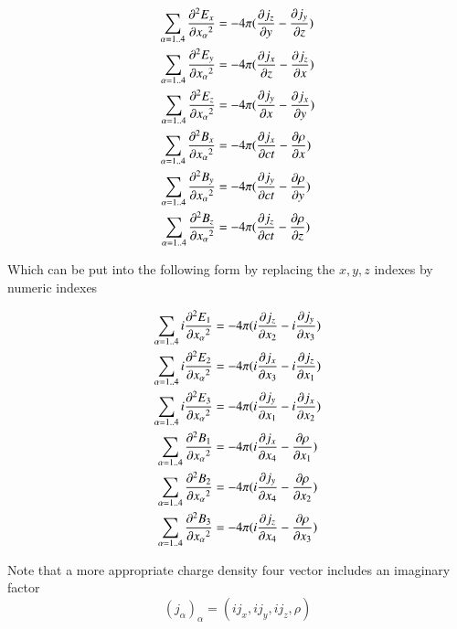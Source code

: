 \documentclass{article}      %
\newcommand{\Curl}[1]{\nabla \times \mathbf{#1}}
\newcommand{\dds}[2]{ {{\partial^2{#1}} \over {\partial{#2}^2}}}
\newcommand{\D}[2] {{{\partial #2} \over {\partial #1}}}
\begin{document}


\begin{align*}
\sum_{\alpha = 1 .. 4}{\dds{E_x} {x_\alpha}} &= - 4\pi (\D {y}{j_z} - \D {z}{j_y}) \\
\sum_{\alpha = 1 .. 4}{\dds{E_y} {x_\alpha}} &= - 4\pi (\D {z}{j_x} - \D {x}{j_z}) \\
\sum_{\alpha = 1 .. 4}{\dds{E_z} {x_\alpha}} &= - 4\pi (\D {x}{j_y} - \D {y}{j_x}) \\
\sum_{\alpha = 1 .. 4}{\dds{B_x} {x_\alpha}} &= - 4\pi (\D {ct}{j_x} - \D{x}{\rho})\\
\sum_{\alpha = 1 .. 4}{\dds{B_y} {x_\alpha}} &= - 4\pi (\D {ct}{j_y} - \D{y}{\rho})\\
\sum_{\alpha = 1 .. 4}{\dds{B_z} {x_\alpha}} &= - 4\pi (\D {ct}{j_z} - \D{z}{\rho})
\end{align*}

Which can be put into the following form by replacing the $x, y, z$ indexes by numeric indexes

\begin{align*}
\sum_{\alpha = 1 .. 4}{i \dds{E_1} {x_\alpha}} &= - 4\pi (i \D {x_2}{j_z} - i \D {x_3}{j_y}) \\
\sum_{\alpha = 1 .. 4}{i \dds{E_2} {x_\alpha}} &= - 4\pi (i \D {x_3}{j_x} - i \D {x_1}{j_z}) \\
\sum_{\alpha = 1 .. 4}{i \dds{E_3} {x_\alpha}} &= - 4\pi (i \D {x_1}{j_y} - i \D {x_2}{j_x}) \\
\sum_{\alpha = 1 .. 4}{\dds{B_1} {x_\alpha}} &= - 4\pi (i \D {x_4}{j_x} - \D{x_1}{\rho})\\
\sum_{\alpha = 1 .. 4}{\dds{B_2} {x_\alpha}} &= - 4\pi (i \D {x_4}{j_y} - \D{x_2}{\rho})\\
\sum_{\alpha = 1 .. 4}{\dds{B_3} {x_\alpha}} &= - 4\pi (i \D {x_4}{j_z} - \D{x_3}{\rho})
\end{align*}

Note that a more appropriate charge density four vector includes an imaginary factor
\begin{equation*}
(j_\alpha)_\alpha = (i j_x, i j_y, i j_z, \rho)
\end{equation*}
\end{document}
